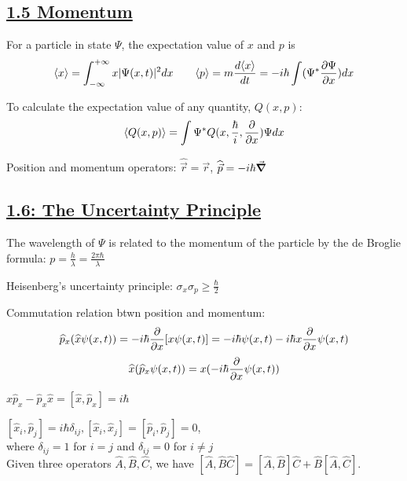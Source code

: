 \subsection{\underline{1.5 Momentum}}
For a particle in state $\Psi$, the expectation value of $x$ and $p$ is
    $$\langle x \rangle = \int_{-\infty}^{+\infty} x |\Psi(x, t)|^2 dx \qquad \langle p \rangle = m \frac{d \langle x \rangle}{dt} = -i \hbar \int (\Psi^* \pdv{\Psi}{x}) dx$$

To calculate the expectation value of any quantity, $Q(x, p)$:
$$\langle Q(x, p) \rangle = \int \Psi^* Q(x, \frac{\hbar}{i}, \pdv{}{x}) \Psi dx$$

Position and momentum operators: $\widehat{\vec{r}} = \vec{r}$, $\widehat{\vec{p}} = -i \hbar \vec{\grad}$

\subsection{\underline{1.6: The Uncertainty Principle}}
The wavelength of $\Psi$ is related to the momentum of the particle by the de Broglie formula:
    $p = \frac{h}{\lambda} = \frac{2 \pi \hbar}{\lambda}$

Heisenberg's uncertainty principle: $\sigma_x \sigma_p \geq \frac{\hbar}{2}$

Commutation relation btwn position and momentum:
$$\widehat{p}_x (\widehat{x} \psi(x, t)) = -i \hbar \pdv{}{x} [x \psi(x, t)] = -i \hbar \psi(x, t) - i \hbar x \pdv{}{x} \psi(x, t)$$
    $$\widehat{x} (\widehat{p}_x \psi(x, t)) = x (-i \hbar \pdv{}{x} \psi(x, t))$$

    $\widehat{x} \widehat{p}_x - \widehat{p}_x \widehat{x} = [\widehat{x}, \widehat{p}_x] = i \hbar$

    $[\widehat{x}_i, \widehat{p}_j ] = i \hbar \delta_{ij}, [\widehat{x}_i, \widehat{x}_j] = [\widehat{p}_i, \widehat{p}_j] = 0$, \\ where $\delta_{ij} = 1$ for $i=j$ and $\delta_{ij} = 0$ for $i \neq j$ \\

Given three operators $\widehat{A}, \widehat{B}, \widehat{C}$, we have $[\widehat{A}, \widehat{B}\widehat{C}] = [\widehat{A}, \widehat{B}] \widehat{C} + \widehat{B} [\widehat{A}, \widehat{C}]$.



